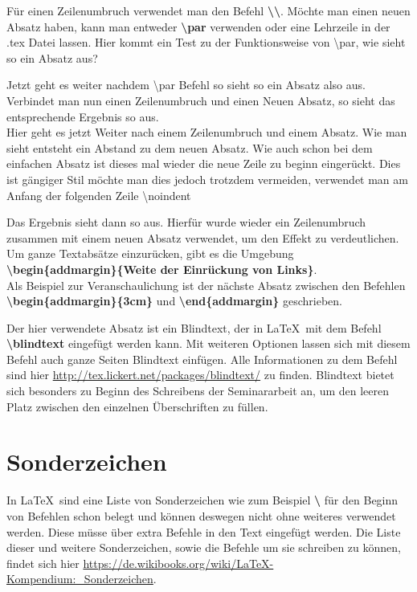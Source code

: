 \documentclass[a4paper, 12pt]{scrreprt}
\begin{document}
Für einen Zeilenumbruch verwendet man den Befehl \textbf{\textbackslash \textbackslash}. 
Möchte man einen neuen Absatz haben, kann man entweder \textbf{\textbackslash par} verwenden oder eine Lehrzeile in der .tex Datei lassen.
Hier kommt ein Test zu der Funktionsweise von \textbackslash par, wie sieht so ein Absatz aus?\par
Jetzt geht es weiter nachdem \textbackslash par Befehl so sieht so ein Absatz also aus. Verbindet man nun einen Zeilenumbruch und einen Neuen Absatz, so sieht das entsprechende Ergebnis so aus.\\

Hier geht es jetzt Weiter nach einem Zeilenumbruch und einem Absatz. Wie man sieht entsteht ein Abstand zu dem neuen Absatz. Wie auch schon bei dem einfachen Absatz ist dieses mal wieder die neue Zeile zu beginn eingerückt. Dies ist gängiger Stil möchte man dies jedoch trotzdem vermeiden, verwendet man am Anfang der folgenden Zeile \textbackslash noindent \\ \par
\noindent Das Ergebnis sieht dann so aus. Hierfür wurde wieder ein Zeilenumbruch zusammen mit einem neuen Absatz verwendet, um den Effekt zu verdeutlichen.\\
Um ganze Textabsätze einzurücken, gibt es die Umgebung\\
\hspace*{0.5cm} \textbf{\textbackslash begin\{addmargin\}\{Weite der Einrückung von Links\}}.\\ Als Beispiel zur Veranschaulichung ist der nächste Absatz zwischen den Befehlen \textbf{\textbackslash begin\{addmargin\}\{3cm\}} und \textbf{\textbackslash end\{addmargin\}} geschrieben.
\begin{addmargin}{1cm}
\blindtext
\end{addmargin}

\noindent Der hier verwendete Absatz ist ein Blindtext, der in \LaTeX\, mit dem Befehl \textbf{\textbackslash blindtext} eingefügt werden kann. Mit weiteren Optionen lassen sich mit diesem Befehl auch ganze Seiten Blindtext einfügen. Alle Informationen zu dem Befehl sind hier \href{http://tex.lickert.net/packages/blindtext/}{http://tex.lickert.net/packages/blindtext/} zu finden. Blindtext bietet sich besonders zu Beginn des Schreibens der Seminararbeit an, um den leeren Platz zwischen den einzelnen Überschriften zu füllen.

\section{Sonderzeichen}
In \LaTeX\, sind eine Liste von Sonderzeichen wie zum Beispiel \textbf{\textbackslash} für den Beginn von Befehlen schon belegt und können deswegen nicht ohne weiteres verwendet werden. Diese müsse über extra Befehle in den Text eingefügt werden. Die Liste dieser und weitere Sonderzeichen, sowie die Befehle um sie schreiben zu können, findet sich hier \href{https://de.wikibooks.org/wiki/LaTeX-Kompendium:_Sonderzeichen}{https://de.wikibooks.org/wiki/LaTeX-Kompendium:\_Sonderzeichen}. 
\end{document}
